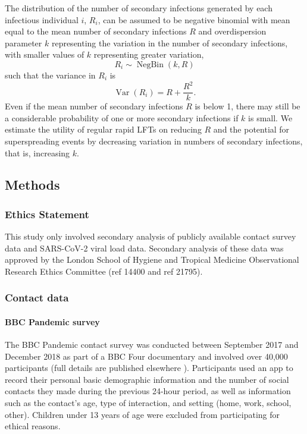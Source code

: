 \documentclass[
  10pt,
  letterpaper,
]{article}
\begin{document}
The distribution of the number of secondary infections generated by each
infectious individual \(i\), \(R_i\), can be assumed to be negative
binomial with mean equal to the mean number of secondary infections
\(R\) and overdispersion parameter \(k\) representing the variation in
the number of secondary infections, with smaller values of \(k\)
representing greater variation, \[
R_i \sim \operatorname{NegBin}(k, R)
\] such that the variance in \(R_i\) is \[
\operatorname{Var}(R_i) = R + \frac{R^2}{k}.
\] Even if the mean number of secondary infections \(R\) is below 1,
there may still be a considerable probability of one or more secondary
infections if \(k\) is small. We estimate the utility of regular rapid
LFTs on reducing \(R\) and the potential for superspreading events by
decreasing variation in numbers of secondary infections, that is,
increasing \(k\).

\subsection{Methods}\label{methods}

\subsubsection{Ethics Statement}\label{ethics-statement}

This study only involved secondary analysis of publicly available
contact survey data and SARS-CoV-2 viral load data. Secondary analysis
of these data was approved by the London School of Hygiene and Tropical
Medicine Observational Research Ethics Committee (ref 14400 and ref
21795).

\subsubsection{Contact data}\label{contact-data}

\paragraph{BBC Pandemic survey}\label{bbc-pandemic-survey}

The BBC Pandemic contact survey was conducted between September 2017 and
December 2018 as part of a BBC Four documentary and involved over 40,000
participants (full details are published elsewhere
\citep{klepac2018, klepac2020, kucharski2020}). Participants used an app
to record their personal basic demographic information and the number of
social contacts they made during the previous 24-hour period, as well as
information such as the contact's age, type of interaction, and setting
(home, work, school, other). Children under 13 years of age were
excluded from participating for ethical reasons.
\end{document}
